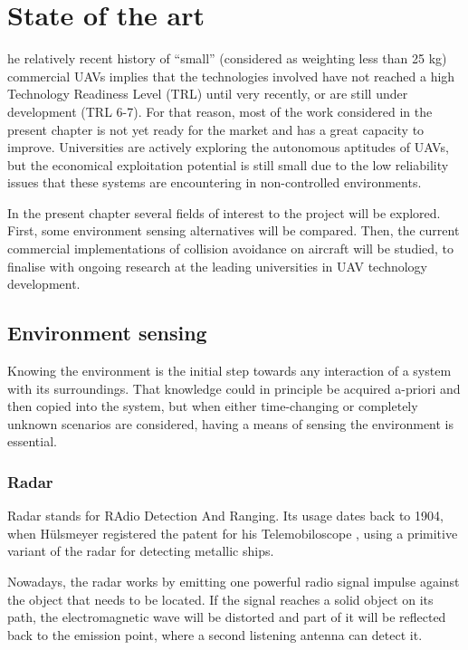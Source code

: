 
\let\textcircled=\pgftextcircled
\chapter{State of the art}

he relatively recent history of ``small'' (considered as weighting less than 25 kg) commercial UAVs implies that the technologies involved have not reached a high Technology Readiness Level (TRL) \cite{assistantsecretaryofdefenseforresearchandengineering2011} until very recently, or are still under development (TRL 6-7).
For that reason, most of the work considered in the present chapter is not yet ready for the market and has a great capacity to improve.
Universities are actively exploring the autonomous aptitudes of UAVs, but the economical exploitation potential is still small due to the low reliability issues that these systems are encountering in non-controlled environments.

In the present chapter several fields of interest to the project will be explored.
First, some environment sensing alternatives will be compared.
Then, the current commercial implementations of collision avoidance on aircraft will be studied, to finalise with ongoing research at the leading universities in UAV technology development.


\section{Environment sensing}

Knowing the environment is the initial step towards any interaction of a system with its surroundings.
That knowledge could in principle be acquired a-priori and then copied into the system, but when either time-changing or completely unknown scenarios are considered, having a means of sensing the environment is essential.

\subsection{Radar}

Radar stands for RAdio Detection And Ranging.
Its usage dates back to 1904, when H\"ulsmeyer registered the patent for his Telemobiloscope \cite{hulsmeyer1904}, using a primitive variant of the radar for detecting metallic ships.

Nowadays, the radar works by emitting one powerful radio signal impulse against the object that needs to be located.
If the signal reaches a solid object on its path, the electromagnetic wave will be distorted and part of it will be reflected back to the emission point, where a second listening antenna can detect it.

